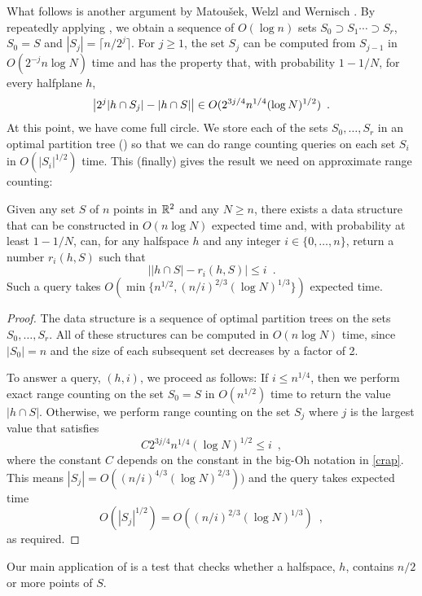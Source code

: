 \documentclass{cccg12}
\begin{document}
What follows is another argument by Matou\v{s}ek, Welzl and Wernisch
\cite[Lemma~2.2]{mww93}.  By repeatedly applying , we
obtain a sequence of $O(\log n)$ sets $S_0\supset S_1\cdots\supset S_r$,
$S_0=S$ and $|S_j|=\lceil n/2^j\rceil$.  For $j\ge 1$, the set $S_j$
can be computed from $S_{j-1}$ in $O(2^{-j}n\log N)$ time and has the
property that, with probability $1-1/N$, for every halfplane $h$,
\begin{equation}
   \left|2^j|h\cap S_j| - |h\cap S|\right| \in O(2^{3j/4}n^{1/4}(\log N)^{1/2}) \enspace .
  \eqlabel{crap}
\end{equation}
At this point, we have come full circle.  We store each
of the sets $S_0,\ldots,S_r$ in an optimal partition tree
() so that we can do range counting
queries on each set $S_i$ in $O(|S_i|^{1/2})$ time.  This (finally)
gives the result we need on approximate range counting:
\begin{lem}
  Given any set $S$ of $n$ points in $\mathbb{R}^2$ and any $N\ge n$, there exists
  a data structure that can be constructed in $O(n\log N)$ expected time
  and, with probability at least $1-1/N$, can, for any halfspace $h$
  and any integer $i\in\{0,\ldots,n\}$, return a number $r_i(h,S)$ such that
  \[  \left||h\cap S|-r_i(h,S)\right| \le i \enspace .\]
  Such a query takes $O(\min\{n^{1/2},(n/i)^{2/3}(\log N)^{1/3}\})$ expected time.
\end{lem}

\begin{proof}
  The data structure is a sequence of optimal partition trees on the
  sets $S_0,\ldots,S_r$.  All of these structures can be computed in
  $O(n\log N)$ time, since $|S_0|=n$ and the size of each subsequent
  set decreases by a factor of 2.

  To answer a query, $(h,i)$, we proceed as follows: If $i\le n^{1/4}$,
  then we perform exact range counting on the set $S_0=S$ in $O(n^{1/2})$
  time to return the value $|h\cap S|$.  Otherwise, we perform range
  counting on the set $S_j$ where $j$ is the largest value that satisfies
  \[
      C2^{3j/4} n^{1/4}(\log N)^{1/2} \le i \enspace ,
  \]
  where the constant $C$ depends on the constant in the big-Oh notation
  in \eqref{crap}.  This means $|S_j| = O((n/i)^{4/3}(\log N)^{2/3}))$
  and the query takes expected time
  \[
      O(|S_j|^{1/2}) = O((n/i)^{2/3}(\log N)^{1/3}) \enspace ,
  \]
   as required.
\end{proof}

Our main application of  is a test that
checks whether a halfspace, $h$, contains $n/2$ or more points of $S$.
\end{document}
